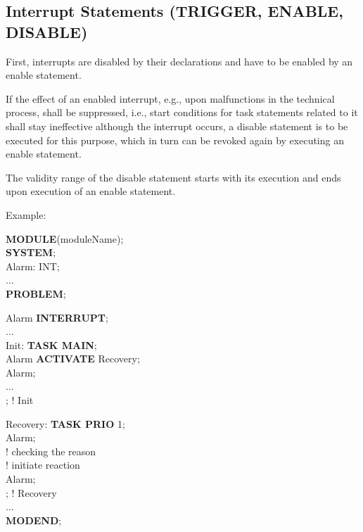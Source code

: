 \subsection{Interrupt Statements (TRIGGER, ENABLE, DISABLE)}    %
\label{sec_task_interrupt}

First, interrupts are disabled by their declarations and have to be
enabled by an enable statement.

If the effect of an enabled interrupt, e.g., upon malfunctions in the
technical process, shall be suppressed, i.e., start conditions for task
statements related to it shall stay ineffective although the interrupt
occurs, a disable statement is to be executed for this purpose, which
in turn can be revoked again by executing an enable statement.



The validity range of the disable statement starts with its
execution and ends upon execution of an enable statement.

Example:

{\bf MODULE}(moduleName);\\
{\bf SYSTEM};\\
\x Alarm: INT;\\
\x ...\\
{\bf PROBLEM};

 Alarm {\bf INTERRUPT};\\
\x ...\\
\x Init: {\bf TASK MAIN};\\
\x {} Alarm {\bf ACTIVATE} Recovery;\\
\x {} Alarm;\\
\x \x ... \\
\x {}; ! Init

\x Recovery: {\bf TASK PRIO} 1;\\
\x {} Alarm;\\
\x \x \x ! checking the reason\\
\x \x \x ! initiate reaction\\
\x {} Alarm;\\
\x {}; ! Recovery\\
\x ...\\
{\bf MODEND};

